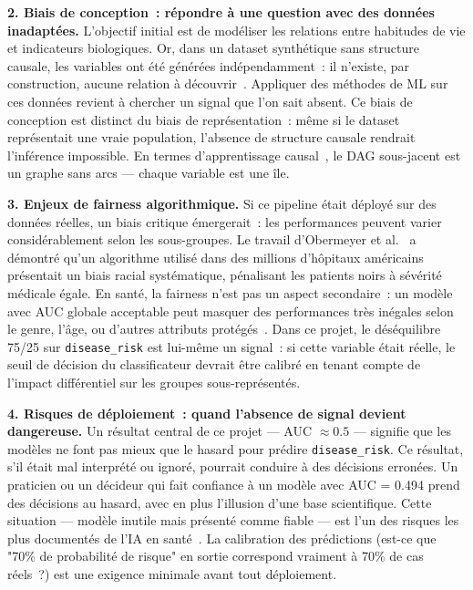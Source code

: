 \textbf{2. Biais de conception~: répondre à une question avec des données inadaptées.} L'objectif initial est de modéliser les relations entre habitudes de vie et indicateurs biologiques. Or, dans un dataset synthétique sans structure causale, les variables ont été générées indépendamment~: il n'existe, par construction, aucune relation à découvrir~\cite{scholkopf2021}. Appliquer des méthodes de ML sur ces données revient à chercher un signal que l'on sait absent. Ce biais de conception est distinct du biais de représentation~: même si le dataset représentait une vraie population, l'absence de structure causale rendrait l'inférence impossible. En termes d'apprentissage causal~\cite{pearl2009}, le DAG sous-jacent est un graphe sans arcs --- chaque variable est une île.

\textbf{3. Enjeux de fairness algorithmique.} Si ce pipeline était déployé sur des données réelles, un biais critique émergerait~: les performances peuvent varier considérablement selon les sous-groupes. Le travail d'Obermeyer et al.~\cite{obermeyer2019} a démontré qu'un algorithme utilisé dans des millions d'hôpitaux américains présentait un biais racial systématique, pénalisant les patients noirs à sévérité médicale égale. En santé, la fairness n'est pas un aspect secondaire~: un modèle avec AUC globale acceptable peut masquer des performances très inégales selon le genre, l'âge, ou d'autres attributs protégés~\cite{rudin2019}. Dans ce projet, le déséquilibre 75/25 sur \texttt{disease\_risk} est lui-même un signal~: si cette variable était réelle, le seuil de décision du classificateur devrait être calibré en tenant compte de l'impact différentiel sur les groupes sous-représentés.

\textbf{4. Risques de déploiement~: quand l'absence de signal devient dangereuse.} Un résultat central de ce projet --- AUC $\approx 0.5$ --- signifie que les modèles ne font pas mieux que le hasard pour prédire \texttt{disease\_risk}. Ce résultat, s'il était mal interprété ou ignoré, pourrait conduire à des décisions erronées. Un praticien ou un décideur qui fait confiance à un modèle avec AUC = 0.494 prend des décisions au hasard, avec en plus l'illusion d'une base scientifique. Cette situation --- modèle inutile mais présenté comme fiable --- est l'un des risques les plus documentés de l'IA en santé~\cite{rajpurkar2022}. La calibration des prédictions (est-ce que "70\% de probabilité de risque" en sortie correspond vraiment à 70\% de cas réels~?) est une exigence minimale avant tout déploiement.

